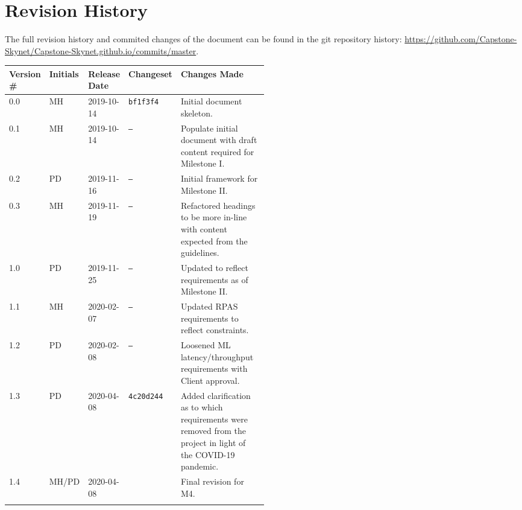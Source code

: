 \section*{Revision History}
The full revision history and commited changes of the document can be found in the git repository history: \href{https://github.com/Capstone-Skynet/Capstone-Skynet.github.io}{https://github.com/Capstone-Skynet/Capstone-Skynet.github.io/commits/master}.

\begin{table}[H]
\begin{tabular}{*{4}{l}p{0.5\linewidth}}
\hline
Version \# & Initials & Release Date & Changeset & Changes Made \\ \hline

0.0 & MH & 2019-10-14 & \texttt{bf1f3f4} & Initial document skeleton.\\
0.1 & MH & 2019-10-14 & \texttt{--} & Populate initial document with draft content required for Milestone I.\\
0.2 & PD & 2019-11-16 & \texttt{--} & Initial framework for Milestone II.\\
0.3 & MH & 2019-11-19 & \texttt{--} & Refactored headings to be more in-line with content expected from the guidelines.\\
1.0 & PD & 2019-11-25 & \texttt{--} & Updated to reflect requirements as of Milestone II.\\
1.1 & MH & 2020-02-07 & \texttt{--} & Updated RPAS requirements to reflect constraints.\\
1.2 & PD & 2020-02-08 & \texttt{--} & Loosened ML latency/throughput requirements with Client approval.\\
1.3 & PD & 2020-04-08 & \texttt{4c20d244} & Added clarification as to which requirements were removed from the project in light of the COVID-19 pandemic.\\
1.4 & MH/PD & 2020-04-08 & \texttt{} & Final revision for M4.\\
 & & & \\ \hline
\end{tabular}
\end{table}
